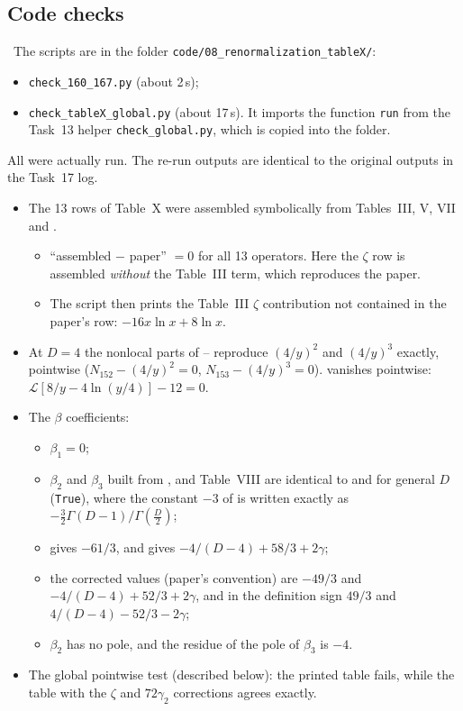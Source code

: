 \subsection{Code checks}
\label{sec:ch08-t17-code}
\tC\ The scripts are in the folder \texttt{code/08\_renormalization\_tableX/}:
\begin{itemize}[itemsep=0pt]
\item \texttt{check\_160\_167.py} (about 2\,s);
\item \texttt{check\_tableX\_global.py} (about 17\,s). It imports the function \texttt{run} from the Task~13 helper \texttt{check\_global.py}, which is copied into the folder.
\end{itemize}
All were actually run. The re-run outputs are identical to the original outputs in the Task~17 log.
\begin{itemize}[leftmargin=*,itemsep=3pt]
\item[(A)] The 13 rows of Table~X were assembled symbolically from Tables~III, V, VII and .
\begin{itemize}[itemsep=0pt]
\item ``assembled $-$ paper'' $=0$ for all 13 operators. Here the $\zeta$ row is assembled \emph{without} the Table~III term, which reproduces the paper.
\item The script then prints the Table~III $\zeta$ contribution not contained in the paper's row: $-16x\ln x+8\ln x$.
\end{itemize}
\item[(B)] At $D=4$ the nonlocal parts of -- reproduce $(4/y)^2$ and $(4/y)^3$ exactly, pointwise ($N_{152}-(4/y)^2=0$, $N_{153}-(4/y)^3=0$).
 vanishes pointwise: $\mathcal L[8/y-4\ln(y/4)]-12=0$.
\item[(C)] The $\beta$ coefficients:
\begin{itemize}[itemsep=0pt]
\item $\beta_1=0$;
\item $\beta_2$ and $\beta_3$ built from ,  and Table~VIII are identical to  and  for general $D$ (\texttt{True}), where the constant $-3$ of  is written exactly as $-\frac32\Gamma(D-1)/\Gamma(\frac D2)$;
\item {} gives $-61/3$, and  gives $-4/(D-4)+58/3+2\gamma$;
\item the corrected values (paper's convention) are $-49/3$ and $-4/(D-4)+52/3+2\gamma$, and in the definition sign $49/3$ and $4/(D-4)-52/3-2\gamma$;
\item $\beta_2$ has no pole, and the residue of the pole of $\beta_3$ is $-4$.
\end{itemize}
\item[(D)] The global pointwise test (described below): the printed table fails, while the table with the $\zeta$ and $72\gamma_2$ corrections agrees exactly.
\end{itemize}

